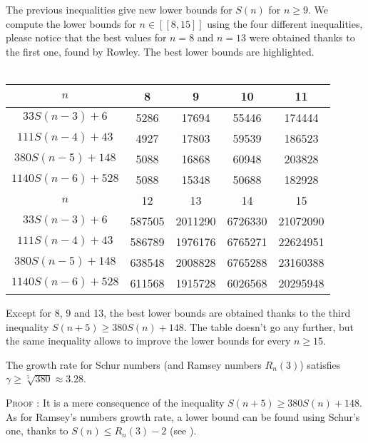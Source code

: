 The previous inequalities give new lower bounds for \(S(n)\) for
\( n \geqslant 9 \). We compute the lower
bounds for \( n \in [\![8,15]\!] \) using the four different inequalities, please notice that the best values for \( n
=8\) and \(n = 13\) were obtained thanks to the first one, found by Rowley. The best lower bounds are highlighted.\\
\\
\begin{center}
\begin{tabular}{|*{5}{c|}}
    \hline
	\(n\) & 8 & 9 & 10 & 11 \\
	\hline
	\(33S(n-3) + 6 \) & \cellcolor{yellow} 5286 & 17694 & 55446 & 174444\\
	\hline
	\(111S(n-4) + 43 \) & 4927 & \cellcolor{yellow} 17803 & 59539 & 186523\\
	\hline
	\(380S(n-5) + 148 \) & 5088 & 16868 & \cellcolor{yellow} 60948 & \cellcolor{yellow} 203828 \\
	\hline
	\(1140S(n-6) + 528 \) & 5088 & 15348 & 50688 & 182928\\
	\hline
	\hline
	\(n\) & 12 & 13 & 14 & 15 \\
	\hline
	\(33S(n-3) + 6 \) & 587505 & \cellcolor{yellow} 2011290 & 6726330 & 21072090\\
	\hline
	\(111S(n-4) + 43 \) & 586789 & 1976176 & 6765271 & 22624951 \\
	\hline
\(380S(n-5) + 148 \) & \cellcolor{yellow} 638548 & 2008828 & \cellcolor{yellow} 6765288 & \cellcolor{yellow} 23160388 \\\hline
	\(1140S(n-6) + 528 \) & 611568 & 1915728 & 6026568 & 20295948 \\
	\hline
\end{tabular}
\end{center}
Except for 8, 9 and 13, the best lower bounds are obtained thanks to
the third inequality \( S(n+5) \geqslant 380S(n) + 148\). The table
doesn't go any further, but the same inequality allows to improve the
lower bounds for every \( n \geqslant 15 \).

\begin{corollary}
The growth rate for Schur numbers (and Ramsey numbers \(R_n(3)\))  satisfies \(\gamma \geqslant \sqrt[5]{380} \approx 3.28 \).
\end{corollary}
\textsc{Proof :} It is a mere consequence of the inequality \( S(n+5) \geqslant 380S(n) + 148\). As for Ramsey's
numbers growth rate, a lower bound can be found using Schur's one, thanks to \(S(n) \leqslant R_n(3)-2 \)
(see \cite{Schur1917}).
